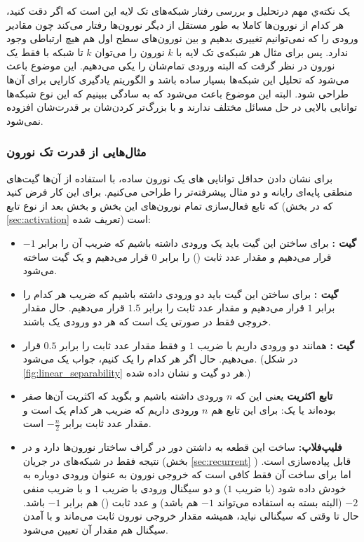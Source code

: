 \documentclass[11pt,a4paper,twocolumn]{article}
\begin{document}
یک نکته‌ي مهم درتحلیل و بررسی رفتار شبکه‌های تک لایه این است که اگر دقت کنید، هر کدام از نورون‌ها کاملا به طور مستقل از دیگر نورون‌ها رفتار می‌کند چون مقادیر ورودی را که نمی‌توانیم تغییری بدهیم و بین نورون‌های سطح اول هم هیچ ارتباطی وجود ندارد. پس برای مثال هر شبکه‌ی تک لایه با $k$ نورون را می‌توان $k$ تا شبکه با فقط یک نورون در نظر گرفت که البته ورودی تمام‌شان را یکی می‌دهیم. این موضوع باعث می‌شود که تحلیل این شبکه‌ها بسیار ساده باشد و الگوریتم یادگیری کارایی برای آن‌ها طراحی شود. البته این موضوع باعث می‌‌شود که به سادگی ببینیم که این نوع شبکه‌ها توانایی بالایی در حل مسائل مختلف ندارند و با بزرگ‌تر کردن‌شان بر قدرت‌شان افزوده نمی‌شود.

\subsubsection{مثال‌هایی از قدرت تک نورون}
برای نشان دادن حداقل توانایی های یک نورون ساده، با استفاده از آن‌ها گیت‌های منطقی پایه‌ای رایانه و دو مثال پیشرفته‌تر را طراحی می‌کنیم. برای این کار فرض کنید که تابع فعال‌سازی تمام نورون‌های این بخش و بخش بعد از نوع تابع 
(که در بخش
\ref{sec:activation}
تعریف شده) است:
\begin{itemize}
  \item
\textbf{گیت :}
برای ساختن این گیت باید یک ورودی داشته باشیم که ضریب آن را برابر $-1$ قرار می‌دهیم و  مقدار عدد ثابت () را برابر $0$ قرار می‌دهیم و یک گیت  ساخته می‌شود.
  \item
\textbf{گیت :}
برای ساختن این گیت باید دو ورودی داشته باشیم که ضریب هر کدام را برابر $1$ قرار می‌دهیم و  مقدار عدد ثابت را برابر $1.5$ قرار می‌دهیم. حال مقدار خروجی فقط در صورتی یک است که هر دو ورودی یک باشند.
  \item
\textbf{گیت :}
همانند  دو ورودی داریم با ضریب $1$ و فقط  مقدار عدد ثابت را برابر $0.5$ قرار می‌دهیم. حال اگر هر کدام را یک کنیم، جواب یک می‌شود. (در شکل
\ref{fig:linear_separability}
هر دو گیت  و  نشان داده شده.)
  \item
\textbf{تابع اکثریت}
یعنی این که $n$ ورودی داشته باشیم و بگوید که اکثریت آن‌ها صفر بوده‌اند یا یک: برای این تابع هم $n$ ورودی داریم که ضریب هر کدام یک است و مقدار عدد ثابت برابر 
$-\frac{n}{2}$
است.
  \item
\textbf{فلیپ‌فلاپ:}
\label{sec:single-neuron}
ساخت این قطعه به داشتن دور در گراف ساختار نورون‌ها دارد و در نتیجه فقط در شبکه‌های در جریان (بخش
\ref{sec:recurrent}
)
قابل پیاده‌سازی است. اما برای ساخت آن فقط کافی است که خروجی نورون به عنوان ورودی دوباره به خودش داده شود (با ضریب $1$) و دو سیگنال ورودی  با ضریب $1$ و  با ضریب منفی $-2$ (البته بسته به استفاده می‌تواند $-1$ هم باشد) و عدد ثابت () هم برابر $-1$ باشد. حال تا وقتی که سیگنالی نیاید، همیشه مقدار خروجی نورون ثابت می‌ماند و با آمدن سیگنال هم مقدار آن تعیین می‌شود.
\end{itemize}
\end{document}
